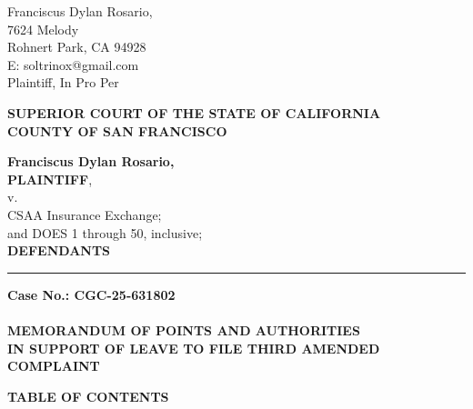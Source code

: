 

\nolinenumbers
\begin{singlespace}
Franciscus Dylan Rosario, \\
7624 Melody \\
Rohnert Park, CA 94928 \\
E: soltrinox@gmail.com \\
Plaintiff, In Pro Per \\
\end{singlespace}
\vspace*{9mm}
\begin{tightcenter}
\textbf{SUPERIOR COURT OF THE STATE OF CALIFORNIA} \\
\textbf{COUNTY OF SAN FRANCISCO}
\end{tightcenter}
\vspace*{2.25mm}
\nolinenumbers
\begin{minipage}[t]{3in}
    \raggedright
    \textbf{Franciscus Dylan Rosario,} \\ \textbf{PLAINTIFF}, \\
    \hspace{1cm} v. \\
    \small
    CSAA Insurance Exchange; \\
    and DOES 1 through 50, inclusive; \\
    \normalsize
    \textbf{DEFENDANTS}
    \makebox[3in]{\hrulefill}
\end{minipage}%
\hspace{3mm}
\begin{minipage}[t]{0.5pt}
    \vspace{0pt}
    \rule{0.5pt}{2.0in}
\end{minipage}
\hspace{3mm}
\begin{minipage}[t]{3in}
    \raggedright
    \noindent \textbf{Case No.: CGC-25-631802} \\
    ~\\
    \textbf{MEMORANDUM OF POINTS AND AUTHORITIES} \\
    \textbf{IN SUPPORT OF LEAVE TO FILE THIRD AMENDED COMPLAINT}
\end{minipage}
\vspace*{6mm}
\linenumbers
\begin{center}\textbf{TABLE OF CONTENTS}\end{center}
\vspace{2mm}
